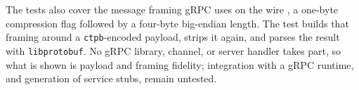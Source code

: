 The tests also cover the message framing gRPC uses on the wire \cite{grpc_spec}, a one-byte compression flag followed by a four-byte big-endian length. The test builds that framing around a \texttt{ctpb}-encoded payload, strips it again, and parses the result with \texttt{libprotobuf}. No gRPC library, channel, or server handler takes part, so what is shown is payload and framing fidelity; integration with a gRPC runtime, and generation of service stubs, remain untested.
